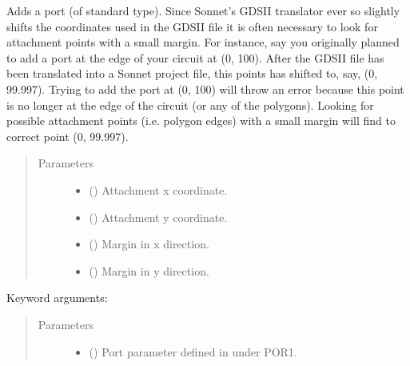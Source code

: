\documentclass[letterpaper,10pt,english,openany]{sphinxmanual}
\begin{document}
\begin{fulllineitems}
\begin{fulllineitems}
\label{\detokenize{source/sonpy:sonpy.sonnet.addPort}}
Adds a port (of standard type). Since Sonnet’s GDSII translator ever so slightly shifts the coordinates used in the GDSII file it is often necessary to look for attachment points with a small margin. For instance, say you originally planned to add a port at the edge of your circuit at (0, 100). After the GDSII file has been translated into a Sonnet project file, this points has shifted to, say, (0, 99.997). Trying to add the port at (0, 100) will throw an error because this point is no longer at the edge of the circuit (or any of the polygons). Looking for possible attachment points (i.e. polygon edges) with a small margin will find to correct point (0, 99.997).
\begin{quote}\begin{description}
\item[{Parameters}] \leavevmode\begin{itemize}
\item {} 
 () \textendash{} Attachment x coordinate.

\item {} 
 () \textendash{} Attachment y coordinate.

\item {} 
 () \textendash{} Margin in x direction.

\item {} 
 () \textendash{} Margin in y direction.

\end{itemize}

\end{description}\end{quote}

Keyword arguments:
\begin{quote}\begin{description}
\item[{Parameters}] \leavevmode\begin{itemize}
\item {} 
 () \textendash{} Port parameter defined in \label{\detokenize{source/sonpy:id1}}{\hyperref[\detokenize{source/users_guide:son15}]{\sphinxcrossref{{[}Son15{]}}}} under POR1.


\end{itemize}
\end{description}
\end{quote}
\end{fulllineitems}
\end{fulllineitems}
\end{document}
